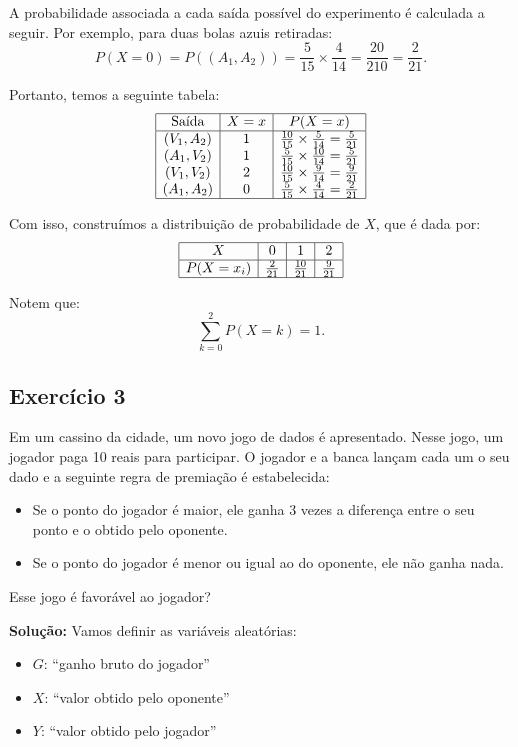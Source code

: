 \documentclass{article}
\begin{document}
A probabilidade associada a cada saída possível do experimento é calculada a seguir. Por exemplo, para duas bolas azuis retiradas:
    $$
    P(X = 0) = P((A_1, A_2)) = \frac{5}{15} \times \frac{4}{14} = \frac{20}{210} = \frac{2}{21}.
    $$

Portanto, temos a seguinte tabela:
    $$
    \begin{array}{|c|c|c|}
    \hline
    \text{Saída} & X = x & P(X = x) \\
    \hline
    (V_1, A_2) & 1 & \tfrac{10}{15} \times \tfrac{5}{14} = \tfrac{5}{21} \\
    (A_1, V_2) & 1 & \tfrac{5}{15} \times \tfrac{10}{14} = \tfrac{5}{21} \\
    (V_1, V_2) & 2 & \tfrac{10}{15} \times \tfrac{9}{14} = \tfrac{9}{21} \\
    (A_1, A_2) & 0 & \tfrac{5}{15} \times \tfrac{4}{14} = \tfrac{2}{21} \\
    \hline
    \end{array}
    $$

Com isso, construímos a distribuição de probabilidade de $X$, que é dada por:
    $$
    \begin{array}{|c|c|c|c|}
    \hline
    X & 0 & 1 & 2 \\
    \hline
    P(X = x_i) & \tfrac{2}{21} & \tfrac{10}{21} & \tfrac{9}{21} \\
    \hline
    \end{array}
    $$

Notem que:
    $$
    \sum_{k=0}^{2} P(X = k) = 1.
    $$

\subsection{Exercício 3}
Em um cassino da cidade, um novo jogo de dados é apresentado. Nesse jogo, um jogador paga 10 reais para participar. O jogador e a banca lançam cada um o seu dado e a seguinte regra de premiação é estabelecida:
\begin{itemize}
    \item Se o ponto do jogador é maior, ele ganha 3 vezes a diferença entre o seu ponto e o obtido pelo oponente.
    \item Se o ponto do jogador é menor ou igual ao do oponente, ele não ganha nada.
\end{itemize}
Esse jogo é favorável ao jogador?

\vspace{0.5cm}
\textbf{Solução:}
Vamos definir as variáveis aleatórias:
\begin{itemize}
    \item $G$: ``ganho bruto do jogador'' 
    \item $X$: ``valor obtido pelo oponente''
    \item $Y$: ``valor obtido pelo jogador''
\end{itemize}
\end{document}
